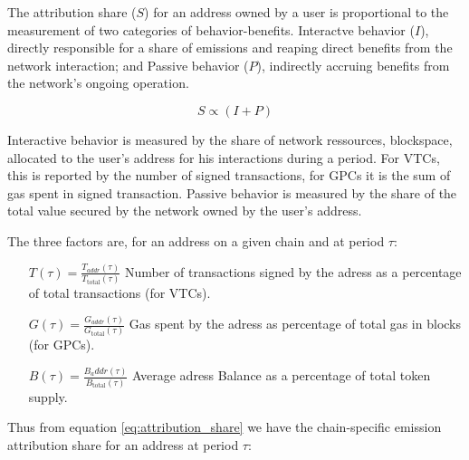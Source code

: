 \documentclass[11pt]{report}
\begin{document}
The attribution share ($S$) for an address owned by a user is proportional to the measurement of two categories of behavior-benefits. Interactve behavior ($I$), directly responsible for a share of emissions and reaping direct benefits from the network interaction; and Passive behavior ($P$), indirectly accruing benefits from the network's ongoing operation.

\begin{equation}
    S \propto (I + P)
    \label{eq:attribution_share}
\end{equation}

Interactive behavior is measured by the share of network ressources, blockspace, allocated to the user's address for his interactions during a period. For \ac{VTC}s, this is reported by the number of signed transactions, for \ac{GPC}s it is the sum of gas spent in signed transaction. Passive behavior is measured by the share of the total value secured by the network owned by the user's address.

The three factors are, for an address on a given chain and at period $\tau$:

\begin{description}[leftmargin=!, labelwidth=\widthof{\bfseries Passive Behavior}]

    \item[Interactive Behavior $(I)$] \hfill
        \begin{itemize}[labelwidth=4cm, align=left, labelsep=0pt]
            \item[\( T(\tau) = \frac{T_{addr}(\tau)}{T_{\text{total}}(\tau)} \)]
                Number of transactions signed by the adress as a percentage of total transactions (for VTCs).

            \item[\(G(\tau) = \frac{G_{addr}(\tau)}{G_{\text{total}}(\tau)} \)]
                Gas spent by the adress as percentage of total gas in blocks (for GPCs).
        \end{itemize}

    \item[Passive Behavior $P$] \hfil
        \begin{itemize}[labelwidth=4cm, align=left, labelsep=0pt]
            \item[\(B(\tau) = \frac{B_addr(\tau)}{B_{\text{total}}(\tau)} \)]
                Average adress Balance as a percentage of total token supply.
        \end{itemize}

\end{description}
\parsep 5pt
Thus from equation \eqref{eq:attribution_share} we have the chain-specific emission attribution share for an address at period $\tau$:
\end{document}

